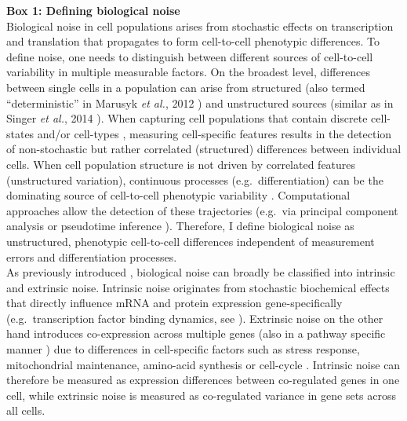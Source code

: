 \begin{Comment}
\hspace{-2.5mm}\textbf{Box 1: Defining biological noise}\label{box1}\\
\small
Biological noise in cell populations arises from stochastic effects on transcription and translation that propagates to form cell-to-cell phenotypic differences. To define noise, one needs to distinguish between different sources of cell-to-cell variability in multiple measurable factors. On the broadest level, differences between single cells in a population can arise from structured (also termed “deterministic” in Marusyk \emph{et al.}, 2012 \citep{Marusyk2012}) and unstructured sources (similar as in Singer \emph{et al.}, 2014 \citep{Singer2014}). When capturing cell populations that contain discrete cell-states and/or cell-types \citep{Paul2015, Ibarra-Soria2018, Rosenberg2018}, measuring cell-specific features results in the detection of non-stochastic but rather correlated (structured) differences between individual cells. When cell population structure is not driven by correlated features (unstructured variation), continuous processes (e.g.~differentiation) can be the dominating source of cell-to-cell phenotypic variability \citep{Dahlin2018}. Computational approaches allow the detection of these trajectories (e.g.~via principal component analysis or pseudotime inference \citep{Trapnell2014, Angerer2015}). Therefore, I define biological noise as unstructured, phenotypic cell-to-cell differences independent of measurement errors and differentiation processes. \\

As previously introduced \citep{Elowitz2002}, biological noise can broadly be classified into intrinsic and extrinsic noise. Intrinsic noise originates from stochastic biochemical effects that directly influence mRNA and protein expression gene-specifically (e.g.~transcription factor binding dynamics, see \citep{Swain2002}). Extrinsic noise on the other hand introduces co-expression across multiple genes (also in a pathway specific manner \citep{Raser2010}) due to differences in cell-specific factors such as stress response, mitochondrial maintenance, amino-acid synthesis \citep{Stewart-Ornstein2012} or cell-cycle \citep{Zopf2013}. Intrinsic noise can therefore be measured as expression differences between co-regulated genes in one cell, while extrinsic noise is measured as co-regulated variance in gene sets across all cells.
\end{Comment}


